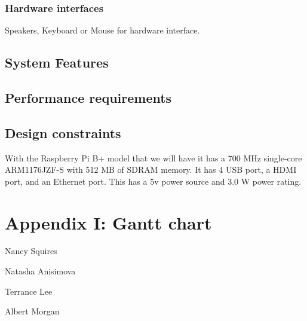 \documentclass[10pt,journal,draftclsnofoot,onecolumn]{IEEEtran}
\begin{document}
	\subsubsection{Hardware interfaces}
	Speakers, Keyboard or Mouse for hardware interface.
	\subsection{System Features}	
	\subsection{Performance requirements}
	\subsection{Design constraints}
	With the Raspberry Pi B+ model that we will have it has a 700 MHz single-core ARM1176JZF-S with 512 MB of SDRAM memory.  It has 4 USB port, a HDMI port, and an Ethernet port.  This has a 5v power source and 3.0 W power rating.

	
	
\section{Appendix I: Gantt chart}

\begin{minipage}{\textwidth}
	
	\vspace{1in}
	\noindent Nancy Squires

	\vspace{1in}
	\noindent Natasha Anisimova

	\vspace{1in}
	\noindent Terrance Lee

	\vspace{1in}
	\noindent Albert Morgan\\

\end{minipage}
\end{document}
